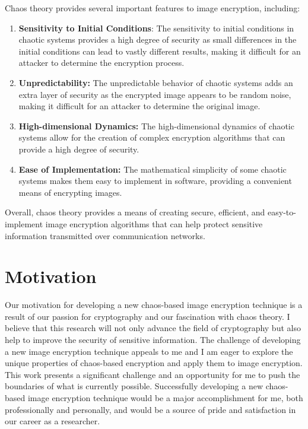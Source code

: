 \documentclass[11pt,a4paper,english]{article}
\begin{document}
Chaos theory provides several important features to image encryption, including:
\begin{enumerate}
    \item \textbf{Sensitivity to Initial Conditions}: The sensitivity to initial conditions in chaotic systems provides a high degree of security as small differences in the initial conditions can lead to vastly different results, making it difficult for an attacker to determine the encryption process.
    \item \textbf{Unpredictability:} The unpredictable behavior of chaotic systems adds an extra layer of security as the encrypted image appears to be random noise, making it difficult for an attacker to determine the original image.
    \item \textbf{High-dimensional Dynamics:} The high-dimensional dynamics of chaotic systems allow for the creation of complex encryption algorithms that can provide a high degree of security.
    \item \textbf{Ease of Implementation:} The mathematical simplicity of some chaotic systems makes them easy to implement in software, providing a convenient means of encrypting images.
\end{enumerate}
Overall, chaos theory provides a means of creating secure, efficient, and easy-to-implement image encryption algorithms that can help protect sensitive information transmitted over communication networks.
\newpage
\section{Motivation}

Our motivation for developing a new chaos-based image encryption technique is a result of our passion for cryptography and our fascination with chaos theory. I believe that this research will not only advance the field of cryptography but also help to improve the security of sensitive information. The challenge of developing a new image encryption technique appeals to me and I am eager to explore the unique properties of chaos-based encryption and apply them to image encryption. This work presents a significant challenge and an opportunity for me to push the boundaries of what is currently possible. Successfully developing a new chaos-based image encryption technique would be a major accomplishment for me, both professionally and personally, and would be a source of pride and satisfaction in our career as a researcher.
\paragraph{}
\newpage
\end{document}
